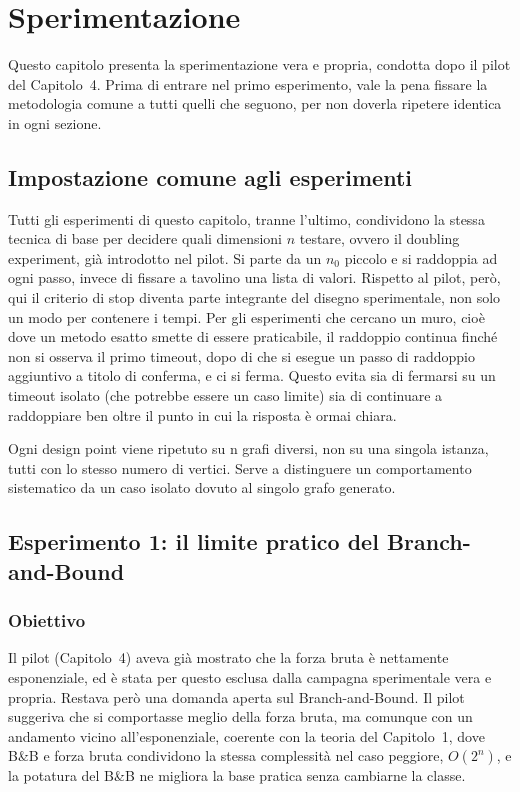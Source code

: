 \chapter{Sperimentazione}

Questo capitolo presenta la sperimentazione vera e propria, 
condotta dopo il pilot del Capitolo~4. 
Prima di entrare nel primo esperimento, vale la pena fissare la metodologia 
comune a tutti quelli che seguono, per non doverla ripetere identica in ogni sezione.

\section{Impostazione comune agli esperimenti}

Tutti gli esperimenti di questo capitolo, tranne l'ultimo, condividono la stessa tecnica 
di base per decidere quali dimensioni $n$ testare, ovvero il doubling experiment, già introdotto 
nel pilot. Si parte da un $n_0$ piccolo e si raddoppia ad ogni passo, 
invece di fissare a tavolino una lista di valori. 
Rispetto al pilot, però, qui il criterio di stop diventa parte integrante del disegno 
sperimentale, non solo un modo per contenere i tempi. Per gli esperimenti che cercano 
un muro, cioè dove un metodo esatto smette di essere praticabile, 
il raddoppio continua finché non si osserva il primo timeout, dopo di che si esegue un 
passo di raddoppio aggiuntivo a titolo di conferma, e ci si ferma. Questo evita sia 
di fermarsi su un timeout isolato (che potrebbe essere un caso limite) sia di continuare 
a raddoppiare ben oltre il punto in cui la risposta è ormai chiara.

Ogni design point viene ripetuto su n grafi diversi, non su una singola istanza, tutti con lo stesso numero di vertici. 
Serve a distinguere un comportamento sistematico da un caso isolato dovuto al singolo grafo generato.
\section{Esperimento 1: il limite pratico del Branch-and-Bound}

\subsection{Obiettivo}

Il pilot (Capitolo~4) aveva già mostrato che la forza bruta è nettamente esponenziale, 
ed è stata per questo esclusa dalla campagna sperimentale vera e propria. 
Restava però una domanda aperta sul Branch-and-Bound. 
Il pilot suggeriva che si comportasse meglio della forza bruta, 
ma comunque con un andamento vicino all'esponenziale, coerente con la teoria del Capitolo~1, dove B\&B e forza bruta condividono la stessa complessità 
nel caso peggiore, $O(2^n)$, e la potatura del B\&B ne migliora la base pratica senza cambiarne la classe.

